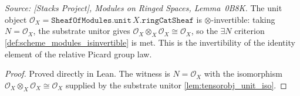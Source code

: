 \begin{lemma}

  \label{lem:unit_isinvertible}
  \textit{Source: [Stacks Project], Modules on Ringed Spaces, Lemma~0B8K.}
  The unit object \(\mathcal{O}_X = \mathtt{SheafOfModules.unit}\,X.\mathtt{ringCatSheaf}\)
  is \(\otimes\)-invertible: taking \(N = \mathcal{O}_X\), the substrate unitor gives
  \(\mathcal{O}_X \otimes_X \mathcal{O}_X \cong \mathcal{O}_X\), so the \(\exists N\)
  criterion \cref{def:scheme_modules_isinvertible} is met. This is the invertibility of
  the identity element of the relative Picard group law.
\end{lemma}
\begin{proof}
  \leanok
  Proved directly in Lean. The witness is \(N = \mathcal{O}_X\) with the isomorphism
  \(\mathcal{O}_X \otimes_X \mathcal{O}_X \cong \mathcal{O}_X\) supplied by the substrate
  unitor \cref{lem:tensorobj_unit_iso}.
\end{proof}

